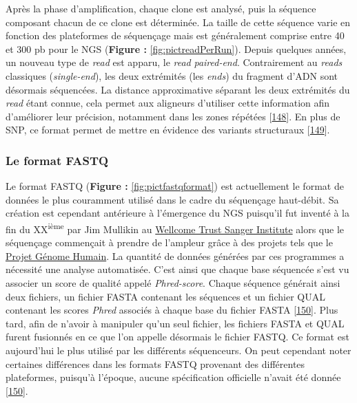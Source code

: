 \documentclass[12pt,a4paper,twoside]{ugathesis}
\theoremstyle{definition}
\theoremstyle{definition}
\theoremstyle{definition}
\theoremstyle{remark}
\begin{document}
Après la phase d'amplification, chaque clone est analysé, puis la
séquence composant chacun de ce clone est déterminée. La taille de cette
séquence varie en fonction des plateformes de séquençage mais est
généralement comprise entre 40 et 300 pb pour le NGS (\textbf{Figure :
}\ref{fig:pictreadPerRun}). Depuis quelques années, un nouveau type de
\emph{read} est apparu, le \emph{read} \emph{paired-end}. Contrairement
au \emph{reads} classiques (\emph{single-end}), les deux extrémités (les
\emph{ends}) du fragment d'ADN sont désormais séquencées. La distance
approximative séparant les deux extrémités du \emph{read} étant connue,
cela permet aux aligneurs d'utiliser cette information afin d'améliorer
leur précision, notamment dans les zones répétées
{[}\protect\hyperlink{ref-Li2008}{148}{]}. En plus de SNP, ce format
permet de mettre en évidence des variants structuraux
{[}\protect\hyperlink{ref-Korbel2009}{149}{]}.

\newpage

\subsubsection{Le format FASTQ}\label{fastq}

Le format FASTQ (\textbf{Figure : }\ref{fig:pictfastqformat}) est
actuellement le format de données le plus couramment utilisé dans le
cadre du séquençage haut-débit. Sa création est cependant antérieure à
l'émergence du NGS puisqu'il fut inventé à la fin du
XX\textsuperscript{ième} par Jim Mullikin au
\href{https://fr.wikipedia.org/wiki/Wellcome_Trust_Sanger_Institute}{Wellcome
Trust Sanger Institute} alors que le séquençage commençait à prendre de
l'ampleur grâce à des projets tels que le
\href{https://fr.wikipedia.org/wiki/Projet_G\%C3\%A9nome_Humain}{Projet
Génome Humain}. La quantité de données générées par ces programmes a
nécessité une analyse automatisée. C'est ainsi que chaque base séquencée
s'est vu associer un score de qualité appelé \emph{Phred-score}. Chaque
séquence générait ainsi deux fichiers, un fichier FASTA contenant les
séquences et un fichier QUAL contenant les scores \emph{Phred} associés
à chaque base du fichier FASTA
{[}\protect\hyperlink{ref-Cock2009}{150}{]}. Plus tard, afin de n'avoir
à manipuler qu'un seul fichier, les fichiers FASTA et QUAL furent
fusionnés en ce que l'on appelle désormais le fichier FASTQ. Ce format
est aujourd'hui le plus utilisé par les différents séquenceurs. On peut
cependant noter certaines différences dans les formats FASTQ provenant
des différentes plateformes, puisqu'à l'époque, aucune spécification
officielle n'avait été donnée
{[}\protect\hyperlink{ref-Cock2009}{150}{]}.
\end{document}
